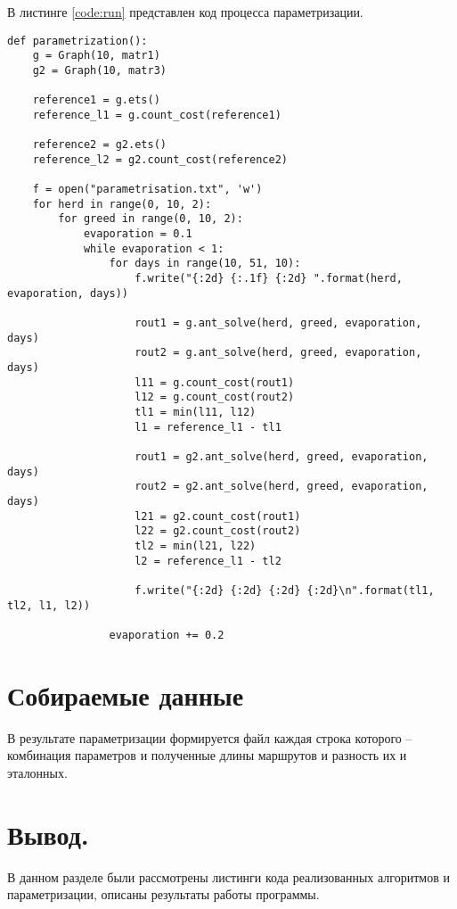 \par В листинге \ref{code:run} представлен код процесса параметризации.
\begin{lstlisting}[caption= Параметриазция, label=code:run]
def parametrization():
	g = Graph(10, matr1)
	g2 = Graph(10, matr3)
	
	reference1 = g.ets()
	reference_l1 = g.count_cost(reference1)
	
	reference2 = g2.ets()
	reference_l2 = g2.count_cost(reference2)
	
	f = open("parametrisation.txt", 'w')
	for herd in range(0, 10, 2):
		for greed in range(0, 10, 2):
			evaporation = 0.1
			while evaporation < 1:
				for days in range(10, 51, 10):
					f.write("{:2d} {:.1f} {:2d} ".format(herd, evaporation, days))
					
					rout1 = g.ant_solve(herd, greed, evaporation, days)
					rout2 = g.ant_solve(herd, greed, evaporation, days)
					l11 = g.count_cost(rout1)
					l12 = g.count_cost(rout2)
					tl1 = min(l11, l12)
					l1 = reference_l1 - tl1
					
					rout1 = g2.ant_solve(herd, greed, evaporation, days)
					rout2 = g2.ant_solve(herd, greed, evaporation, days)
					l21 = g2.count_cost(rout1)
					l22 = g2.count_cost(rout2)
					tl2 = min(l21, l22)
					l2 = reference_l1 - tl2
					
					f.write("{:2d} {:2d} {:2d} {:2d}\n".format(tl1, tl2, l1, l2))
				
				evaporation += 0.2
\end{lstlisting}

\section{Собираемые данные}
\label{sec:tests}
В результате параметризации формируется файл каждая строка которого -- комбинация параметров и полученные длины маршрутов и разность их и эталонных.

\section{Вывод.}
\label{sec:tres}
В данном разделе были рассмотрены листинги кода реализованных алгоритмов и параметризации, описаны результаты работы программы.
